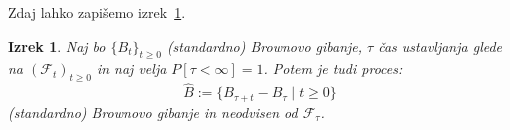 \documentclass[11pt]{article}
\newcommand{\f}{\mathcal{F}}
\theoremstyle{definition}
\theoremstyle{plain}
\newtheorem{izrek}{Izrek}
\begin{document}
    Zdaj lahko zapišemo izrek~\ref{thm:stopped_brownian}. %
    
\begin{izrek}
        Naj bo \(\{B_t\}_{t \geq 0}\) (standardno) Brownovo gibanje, \(\tau\) čas ustavljanja glede na 
        \((\f_t)_{t \ge 0} \) in naj velja \(P[\tau < \infty] = 1\).
        Potem je tudi proces:
        \[
        \hat{B} := \{B_{\tau+t} - B_\tau \mid t \geq 0\}
        \]
        (standardno) Brownovo gibanje in neodvisen od \(\f_\tau\).
    \label{thm:stopped_brownian}
\end{izrek}



\end{document}
